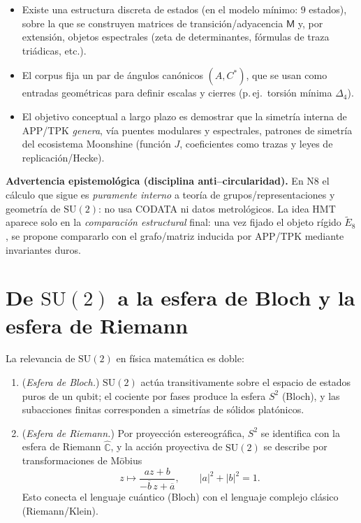 \documentclass[11pt,a4paper]{article}
\theoremstyle{definition}
\theoremstyle{remark}
\begin{document}
\begin{itemize}
\item Existe una estructura discreta de estados (en el modelo mínimo: $9$ estados), sobre la que se construyen matrices de transición/adyacencia $\mathsf M$
y, por extensión, objetos espectrales (zeta de determinantes, fórmulas de traza triádicas, etc.).
\item El corpus fija un par de ángulos canónicos $(A,C^\ast)$, que se usan como entradas geométricas para definir escalas y cierres (p.\,ej.\ torsión mínima $\Delta_4$).
\item El objetivo conceptual a largo plazo es demostrar que la simetría interna de APP/TPK \emph{genera}, vía puentes modulares y espectrales, patrones de simetría
del ecosistema Moonshine (función $J$, coeficientes como trazas y leyes de replicación/Hecke).
\end{itemize}

\textbf{Advertencia epistemológica (disciplina anti--circularidad).}
En N8 el cálculo que sigue es \emph{puramente interno} a teoría de grupos/representaciones y geometría de $\mathrm{SU}(2)$:
no usa CODATA ni datos metrológicos. La idea HMT aparece solo en la \emph{comparación estructural} final:
una vez fijado el objeto rígido $\widetilde{E}_8$, se propone compararlo con el grafo/matriz inducida por APP/TPK mediante invariantes duros.

\section{De $\mathrm{SU}(2)$ a la esfera de Bloch y la esfera de Riemann}
La relevancia de $\mathrm{SU}(2)$ en física matemática es doble:

\begin{enumerate}
\item (\emph{Esfera de Bloch.}) $\mathrm{SU}(2)$ actúa transitivamente sobre el espacio de estados puros de un qubit;
el cociente por fases produce la esfera $S^2$ (Bloch), y las subacciones finitas corresponden a simetrías de sólidos platónicos.
\item (\emph{Esfera de Riemann.}) Por proyección estereográfica, $S^2$ se identifica con la esfera de Riemann $\widehat{\mathbb C}$,
y la acción proyectiva de $\mathrm{SU}(2)$ se describe por transformaciones de Möbius
\[
z\longmapsto \frac{az+b}{-\overline b\,z+\overline a},\qquad |a|^2+|b|^2=1.
\]
Esto conecta el lenguaje cuántico (Bloch) con el lenguaje complejo clásico (Riemann/Klein).
\end{enumerate}
\end{document}
